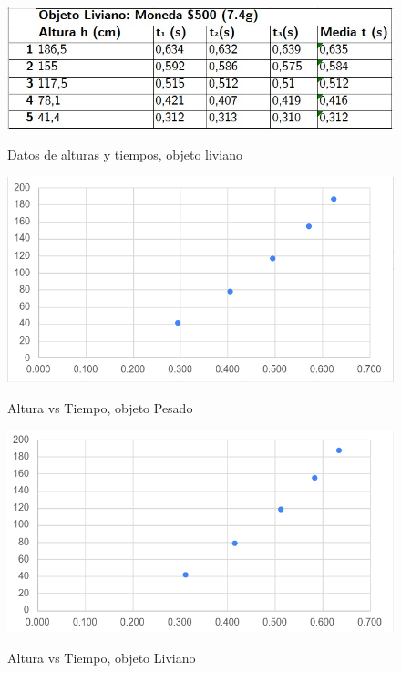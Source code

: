 \begin{multicols}{2}
\begin{figure}[H]
    \caption{Datos de alturas y tiempos, objeto liviano}
    \centering
    \includegraphics[scale=0.3]{fig/Tabla2-ObjetoLiviano.png}
    \label{fig:tabla2}
\end{figure}

\begin{figure}[H]
    \caption{Altura vs Tiempo, objeto Pesado}
    \centering
    \includegraphics[scale=0.5]{fig/objPesado-Altura-Tiempo.png}
    \label{fig:h-t-obj-pesado}
\end{figure}

\vspace{-0.5cm}

\begin{figure}[H]
    \caption{Altura vs Tiempo, objeto Liviano}
    \centering
    \includegraphics[scale=0.5]{fig/objLiviano-Altura-Tiempo.png}
    \label{fig:h-t-obj-liviano}
\end{figure}



\end{multicols}
